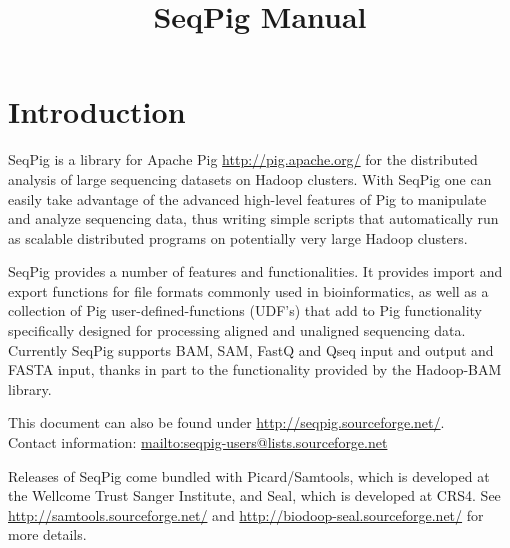\documentclass[a4paper,parskip=half,10pt,bibtotoc,abstracton,oneside,noindent,DIV15]{scrartcl}
\title{SeqPig Manual}
\begin{document}
\maketitle

\tableofcontents
\newpage

\section{Introduction}

SeqPig is a library for Apache Pig \url{http://pig.apache.org/} for the
distributed analysis of large sequencing datasets on Hadoop clusters.  With
SeqPig one can easily take advantage of the advanced high-level features of Pig
to manipulate and analyze sequencing data, thus writing simple scripts that
automatically run as scalable distributed programs on potentially very large
Hadoop clusters.

SeqPig provides a number of features and functionalities.  It provides
import and export functions for file formats commonly used in
bioinformatics, as well as a collection of Pig user-defined-functions
(UDF's) that add to Pig functionality specifically designed for
processing aligned and unaligned sequencing data. Currently SeqPig
supports BAM, SAM, FastQ and Qseq input and output and FASTA input,
thanks in part to the functionality provided by the Hadoop-BAM
library.

This document can also be found under
\url{http://seqpig.sourceforge.net/}.\\ Contact information:
\url{mailto:seqpig-users@lists.sourceforge.net}

Releases of SeqPig come bundled with Picard/Samtools, which is
developed at the Wellcome Trust Sanger Institute, and Seal, which
is developed
at CRS4. See\\
\url{http://samtools.sourceforge.net/} and 
\url{http://biodoop-seal.sourceforge.net/}
for more details.




\end{document}
